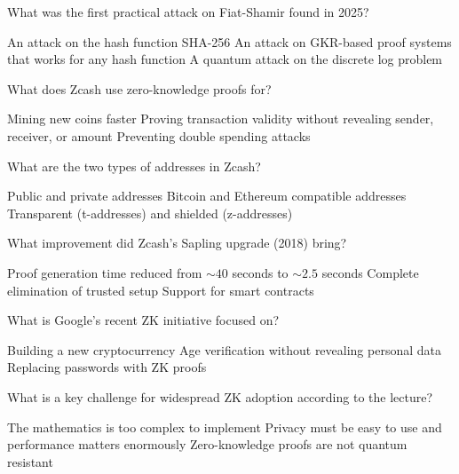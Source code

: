 \documentclass[10pt,a4paper,american]{exam}
\begin{document}
\begin{questions}
	\question What was the first practical attack on Fiat-Shamir found in 2025?
	\begin{randomizechoices}
		\choice An attack on the hash function SHA-256
		\CorrectChoice An attack on GKR-based proof systems that works for any hash function
		\choice A quantum attack on the discrete log problem
	\end{randomizechoices}

	\question What does Zcash use zero-knowledge proofs for?
	\begin{randomizechoices}
		\choice Mining new coins faster
		\CorrectChoice Proving transaction validity without revealing sender, receiver, or amount
		\choice Preventing double spending attacks
	\end{randomizechoices}

	\question What are the two types of addresses in Zcash?
	\begin{randomizechoices}
		\choice Public and private addresses
		\choice Bitcoin and Ethereum compatible addresses
		\CorrectChoice Transparent (t-addresses) and shielded (z-addresses)
	\end{randomizechoices}

	\question What improvement did Zcash's Sapling upgrade (2018) bring?
	\begin{randomizechoices}
		\CorrectChoice Proof generation time reduced from ${\sim}40$ seconds to ${\sim}2.5$ seconds
		\choice Complete elimination of trusted setup
		\choice Support for smart contracts
	\end{randomizechoices}

	\question What is Google's recent ZK initiative focused on?
	\begin{randomizechoices}
		\choice Building a new cryptocurrency
		\CorrectChoice Age verification without revealing personal data
		\choice Replacing passwords with ZK proofs
	\end{randomizechoices}

	\question What is a key challenge for widespread ZK adoption according to the lecture?
	\begin{randomizechoices}
		\choice The mathematics is too complex to implement
		\CorrectChoice Privacy must be easy to use and performance matters enormously
		\choice Zero-knowledge proofs are not quantum resistant
	\end{randomizechoices}

\end{questions}

\clearpage

\end{document}
